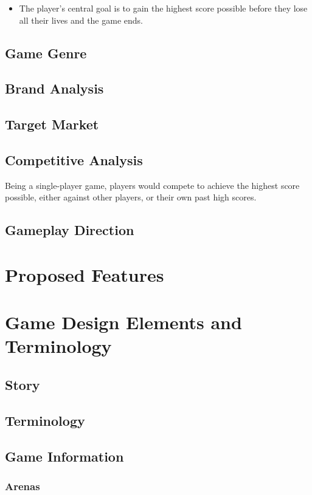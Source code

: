 \documentclass{article}
\theoremstyle{definition}
\begin{document}
\begin{itemize}
  \item The player's central goal is to gain the highest score possible before
    they lose all their lives and the game ends.
\end{itemize}

\subsection{Game Genre}
\subsection{Brand Analysis}
\subsection{Target Market}
\subsection{Competitive Analysis}

Being a single-player game, players would compete to achieve the highest score possible, either against other players, or their own past high scores.

\subsection{Gameplay Direction}
\section{Proposed Features}
\section{Game Design Elements and Terminology}
\subsection{Story}
\subsection{Terminology}
\subsection{Game Information}
\subsubsection{Arenas}
\end{document}

